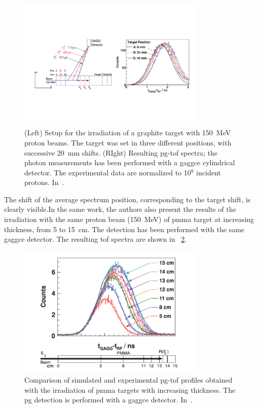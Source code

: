 \begin{figure}[!htbp]
\centering
\includegraphics[width=0.8\textwidth]{03_GraphicFiles/chapter2_GammaCameras/PGT_shifts.pdf}
\caption{(Left) Setup for the irradiation of a graphite target with 150~MeV proton beams. The target was set in three different positions, with successive 20~mm shifts. (RIght) Resulting \gls{pg}-\gls{tof} spectra; the photon measurements has been performed with a \gls{gaggce} cylindrical detector. The experimental data are normalized to 10$^9$ incident protons. In~\cite{Golnik2014}.}
\label{chap2::fig::PGT_shifts}
\end{figure}  

The shift of the average spectrum position, corresponding to the target shift, is clearly visible.In the same work, the authors also present the results of the irradiation with the same proton beam (150~MeV) of \gls{pmma} target at increasing thickness, from 5 to 15~cm. The detection has been performed with the same \gls{gaggce} detector. The resulting \gls{tof} spectra are shown in \figurename~\ref{chap2::fig::PGT_PMMA}.

\begin{figure}[!htbp]
\centering
\includegraphics[width=0.8\textwidth]{03_GraphicFiles/chapter2_GammaCameras/PGT_PMMA.pdf}
\caption{Comparison of simulated and experimental \gls{pg}-\gls{tof} profiles obtained with the irradiation of \gls{pmma} targets with increasing thickness. The \gls{pg} detection is performed with a \gls{gaggce} detector. In~\cite{Golnik2014}.}
\label{chap2::fig::PGT_PMMA}
\end{figure}  


